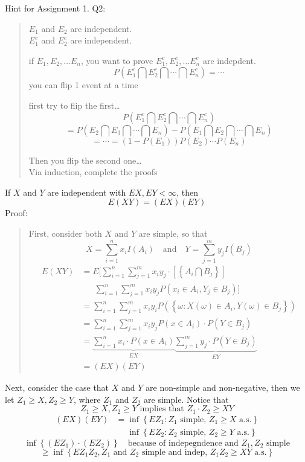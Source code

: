 Hint for Assignment 1. Q2:
\begin{quote}
    $E_1$ and $E_2$ are independent.
    \\$E_1^c$ and $E_2^c$ are independent.

    if $E_1, E_2, \dots E_n$, you want to prove $E_1^c, E_2^c, \dots E_n^c$ are indepdent.
    \[P(E_1^c \bigcap E_2^c \bigcap \cdots \bigcap E_n^c) = \cdots\]
    you can flip 1 event at a time
    
    first try to flip the first\dots
    \[P(E_1^c \bigcap E_2^c \bigcap \cdots \bigcap E_n^c)\]
    \[= P(E_2 \bigcap E_3 \bigcap \cdots \bigcap E_n) - P(E_1 \bigcap E_2 \bigcap \cdots \bigcap E_n)\]
    \[ = \cdots = (1-P(E_1))P(E_2)\cdots P(E_n)\]

    Then you flip the second one\dots
    \\Via induction, complete the proofs
\end{quote}




\newlecture[][Sep 24, 2026]
\begin{theorem}
    If $X$ and $Y$ are independent with $EX, EY < \infty$, then 
    \[E(XY) = (EX)(EY)\]
    Proof: 
    \begin{quote}
        First, consider both $X$ and $Y$ are simple, so that
        \[X= \sum_{i=1}^{n} x_i I(A_i) \quad \text{and} \quad Y= \sum_{j=1}^{m} y_j I(B_j)\]
        \begin{align*}
            E(XY) &= E[\sum_{i=1}^{n}\sum_{j=1}^{m} x_i y_j \cdot [\left\{A_i \bigcap B_j\right\}]\\
            &\phantom{=}\ \sum_{i=1}^{n}\sum_{j=1}^{m} x_i y_j P(x_i \in A_i, Y_j \in B_j)]\\
            &=\sum_{i=1}^{n}\sum_{j=1}^{m} x_i y_i P(\left\{\omega: X(\omega) \in A_i, Y(\omega) \in B_j\right\})\\
            &=\sum_{i=1}^{n}\sum_{j=1}^{m} x_i y_j P(x \in A_i)\cdot P(Y\in B_j)\\
            &=\underbrace{\sum_{i=1}^{n}x_i\cdot P(x\in A_i)}_{EX}  \underbrace{\sum_{j=1}^{m}y_j\cdot P(Y \in B_j)}_{EY}\\
            &= (EX)(EY)
        \end{align*}
    \end{quote}
\end{theorem}

Next, consider the case that $X$ and $Y$ are non-simple and non-negative, then we let $Z_1\geq X, Z_2 \geq Y$, where $Z_1$ and $Z_2$ are simple. Notice that
\[Z_1 \geq X, Z_2 \geq Y \text{ implies that } Z_1 \cdot Z_2 \geq XY\]
\begin{align*}
    (EX)(EY) &= \inf \left\{EZ_1: Z_1 \text{ simple, } Z_1 \geq X \text{ a.s.}\right\}\\
    &\mathrel{\phantom{=}}\inf\left\{EZ_2: Z_2\text{ simple, } Z_2 \geq Y \text{ a.s.}\right\}
\end{align*}
\[ \inf\left\{(EZ_1) \cdot(EZ_2)\right\} \quad \text{because of indepegndence and $Z_1, Z_2$ simple}\]
\[\geq \inf\left\{EZ_1Z_2, Z_1 \text{ and }Z_2 \text{ simple and indep, } Z_1 Z_2\geq XY \text{ a.s.}\right\}\]

